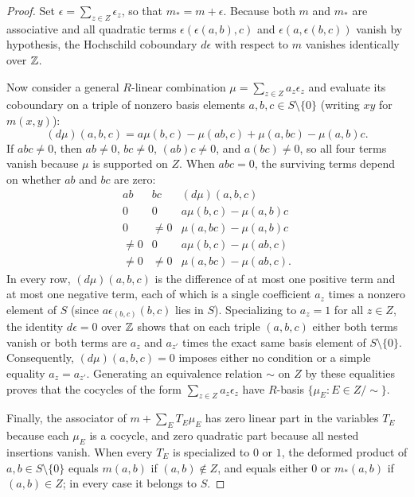 \begin{proof}
Set $\epsilon=\sum_{z\in Z}\epsilon_z$, so that $m_*=m+\epsilon$. Because both $m$ and $m_*$ are associative and all quadratic terms $\epsilon(\epsilon(a,b),c)$ and $\epsilon(a,\epsilon(b,c))$ vanish by hypothesis, the Hochschild coboundary $d\epsilon$ with respect to $m$ vanishes identically over $\mathbb Z$.

Now consider a general $R$-linear combination $\mu=\sum_{z\in Z}a_z\epsilon_z$ and evaluate its coboundary on a triple of nonzero basis elements $a,b,c\in S\setminus\{0\}$ (writing $xy$ for $m(x,y)$):
\[
  (d\mu)(a,b,c)=a\mu(b,c)-\mu(ab,c)+\mu(a,bc)-\mu(a,b)c.
\]
If $abc\ne0$, then $ab\ne0$, $bc\ne0$, $(ab)c\ne0$, and $a(bc)\ne0$, so all four terms vanish because $\mu$ is supported on $Z$. When $abc=0$, the surviving terms depend on whether $ab$ and $bc$ are zero:
\[
  \begin{array}{c|c|c}
  ab & bc & (d\mu)(a,b,c) \\\hline
  0 & 0 & a\mu(b,c)-\mu(a,b)c \\
  0 & \ne0 & \mu(a,bc)-\mu(a,b)c \\
  \ne0 & 0 & a\mu(b,c)-\mu(ab,c) \\
  \ne0 & \ne0 & \mu(a,bc)-\mu(ab,c).
  \end{array}
\]
In every row, $(d\mu)(a,b,c)$ is the difference of at most one positive term and at most one negative term, each of which is a single coefficient $a_z$ times a nonzero element of $S$ (since $a\epsilon_{(b,c)}(b,c)$ lies in $S$). Specializing to $a_z=1$ for all $z\in Z$, the identity $d\epsilon=0$ over $\mathbb Z$ shows that on each triple $(a,b,c)$ either both terms vanish or both terms are $a_z$ and $a_{z'}$ times the exact same basis element of $S\setminus\{0\}$. Consequently, $(d\mu)(a,b,c)=0$ imposes either no condition or a simple equality $a_z=a_{z'}$. Generating an equivalence relation $\sim$ on $Z$ by these equalities proves that the cocycles of the form $\sum_{z\in Z}a_z\epsilon_z$ have $R$-basis $\{\mu_E:E\in Z/{\sim}\}$.

Finally, the associator of $m+\sum_E T_E\mu_E$ has zero linear part in the variables $T_E$ because each $\mu_E$ is a cocycle, and zero quadratic part because all nested insertions vanish. When every $T_E$ is specialized to $0$ or $1$, the deformed product of $a,b\in S\setminus\{0\}$ equals $m(a,b)$ if $(a,b)\notin Z$, and equals either $0$ or $m_*(a,b)$ if $(a,b)\in Z$; in every case it belongs to $S$.
\end{proof}

